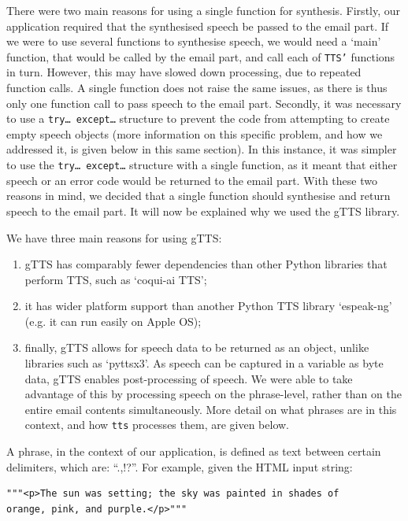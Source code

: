 \documentclass{article}
\begin{document}
There were two main reasons for using a single function for synthesis. Firstly, our application required that the synthesised speech be passed to the email part. If we were to use several functions to synthesise speech, we would need a ‘main’ function, that would be called by the email part, and call each of \texttt{TTS’} functions in turn. However, this may have slowed down processing, due to repeated function calls. A single function does not raise the same issues, as there is thus only one function call to pass speech to the email part. Secondly, it was necessary to use a \texttt{try… except…} structure to prevent the code from attempting to create empty speech objects (more information on this specific problem, and how we addressed it, is given below in this same section). In this instance, it was simpler to use the \texttt{try… except…} structure with a single function, as it meant that either speech or an error code would be returned to the email part. With these two reasons in mind, we decided that a single function should synthesise and return speech to the email part. It will now be explained why we used the gTTS library.

We have three main reasons for using gTTS: 
\begin{enumerate}
\item gTTS has comparably fewer dependencies than other Python libraries that perform TTS, such as ‘coqui-ai TTS’;  
\item it has wider platform support than another Python TTS library ‘espeak-ng’ (e.g. it can run easily on Apple OS);
\item finally, gTTS allows for speech data to be returned as an object, unlike libraries such as ‘pyttsx3’. As speech can be captured in a variable as byte data, gTTS enables post-processing of speech. We were able to take advantage of this by processing speech on the phrase-level, rather than on the entire email contents simultaneously. More detail on what phrases are in this context, and how \texttt{tts} processes them, are given below.
\end{enumerate}


A phrase, in the context of our application, is defined as text between certain delimiters, which are: “.,!?”. For example, given the HTML input string: 

\begin{lstlisting}
"""<p>The sun was setting; the sky was painted in shades of 
orange, pink, and purple.</p>"""
\end{lstlisting}
\end{document}
